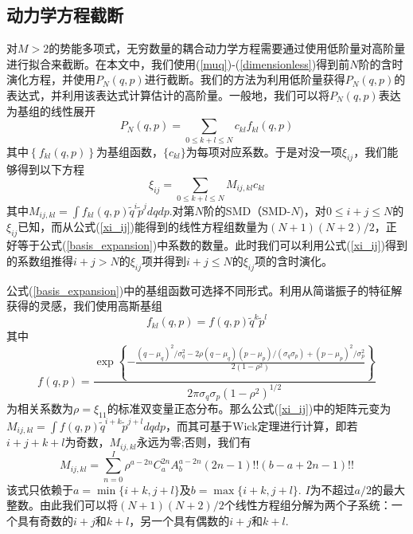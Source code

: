 \subsection{动力学方程截断}
对$M>2$的势能多项式，无穷数量的耦合动力学方程需要通过使用低阶量对高阶量进行拟合来截断。在本文中，我们使用(\ref{muq})-(\ref{dimensionless})得到前$N$阶的含时演化方程，并使用$P_N(q,p)$进行截断。我们的方法为利用低阶量获得$P_N(q,p)$的表达式，并利用该表达式计算估计的高阶量。一般地，我们可以将$P_N(q,p)$表达为基组的线性展开
\begin{equation}
	P_{N}(q, p)=\sum_{0 \leq k+l \leq N} c_{k l} f_{k l}(q, p)
	\label{basis_expansion}
\end{equation}
其中$\left\{f_{k l}(q, p)\right\}$为基组函数，$\{c_{kl}\}$为每项对应系数。于是对没一项$\xi_{ij}$，我们能够得到以下方程
\begin{equation}
	\xi_{i j}=\sum_{0 \leq k+l \leq N} M_{i j, k l} c_{k l}
	\label{xi_ij}
\end{equation}
其中$M_{i j, k l}=\int f_{k l}(q, p) \tilde{q}^{i} \tilde{p}^{j} d q d p$.对第$N$阶的SMD（SMD-$N$)，对$0 \leq i+j \leq N$的$\xi_{ij}$已知，而从公式(\ref{xi_ij})能得到的线性方程组数量为$(N+1)(N+2)/2$，正好等于公式(\ref{basis_expansion})中系数的数量。此时我们可以利用公式(\ref{xi_ij})得到的系数组推得$i+j>N$的$\xi_{ij}$项并得到$i+j\leq N$的$\xi_{ij}$项的含时演化。

公式(\ref{basis_expansion})中的基组函数可选择不同形式。利用从简谐振子的特征解获得的灵感，我们使用高斯基组
\begin{equation}
	f_{k l}(q, p)=f(q, p) \tilde{q}^{k} \tilde{p}^{l}
	\label{dimenstionless_phasespace}
\end{equation}
其中
\begin{equation*}
f(q, p)=\frac{\exp \left\{-\frac{\left(q-\mu_{q}\right)^{2} / \sigma_{q}^{2}-2 \rho\left(q-\mu_{q}\right)\left(p-\mu_{p}\right)/\left(\sigma_{q} \sigma_{p}\right)+\left(p-\mu_{p}\right)^{2} / \sigma_{p}^{2}}{2\left(1-\rho^{2} \right)} \right\} }{2 \pi \sigma_{q} \sigma_{p}\left(1-\rho^{2}\right)^{1 / 2}}
\end{equation*}
为相关系数为$\rho = \xi_{11}$的标准双变量正态分布。那么公式(\ref{xi_ij})中的矩阵元变为$M_{i j, k l}=\int f(q, p) \tilde{q}^{i+k} \tilde{p}^{j+l} d q d p$，而其可基于Wick定理进行计算，即若$i+j+k+l$为奇数，$M_{ij,kl}$永远为零;否则，我们有
\begin{equation}
	M_{i j, k l}=\sum_{n=0}^{I} \rho^{a-2 n} C_{a}^{2 n} A_{b}^{a-2 n}(2 n-1) ! !(b-a+2 n-1) ! !
	\label{matrixelement}
\end{equation}
该式只依赖于$a = \min \{i + k, j + l\}$及$b = \max \{i+k, j+l\}$. $I$为不超过$a/2$的最大整数。由此我们可以将$(N+1)(N+2)/2$个线性方程组分解为两个子系统：一个具有奇数的$i+j$和$k+l$，另一个具有偶数的$i+j$和$k+l$.

